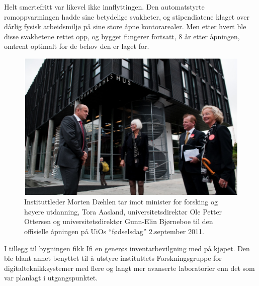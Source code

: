 \documentclass[../../main.tex]{subfiles}
\begin{document}
Helt smertefritt var likevel ikke innflyttingen. Den automatstyrte romoppvarmingen hadde sine betydelige svakheter, og stipendiatene klaget over dårlig fysisk arbeidsmiljø på sine store åpne kontorarealer. Men etter hvert ble disse svakhetene rettet opp, og bygget fungerer fortsatt, 8 år etter åpningen, omtrent optimalt for de behov den er laget for.

\begin{figure}
	\includegraphics[width=\linewidth]{images/ifi2-offisiell-aapning.png}
	\caption{Instituttleder Morten Dæhlen tar imot minister for forsking og høyere utdanning, Tora Aasland, universitetsdirektør Ole Petter Ottersen og universitetsdirektør Gunn-Elin Bjørneboe til den offisielle åpningen på UiOs ``fødselsdag'' 2.september 2011.}
\end{figure}

I tillegg til bygningen fikk Ifi en generøs inventarbevilgning med på kjøpet. Den ble blant annet benyttet til å utstyre instituttets Forskningsgruppe for digitalteknikksystemer med flere og langt mer avanserte laboratorier enn det som var planlagt i utgangspunktet.
\end{document}
